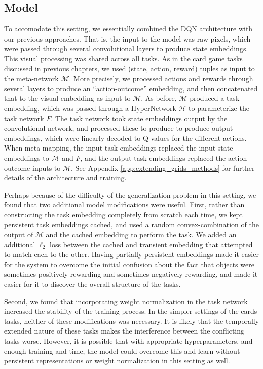 \subsection{Model}
To accomodate this setting, we essentially combined the DQN architecture \citep{Mnih2015} with our previous approaches. That is, the input to the model was raw pixels, which were passed through several convolutional layers to produce state embeddings. This visual processing was shared across all tasks. As in the card game tasks discussed in previous chapters, we used (state, action, reward) tuples as input to the meta-network \(\mathcal{M}\). More precisely, we processed actions and rewards through several layers to produce an ``action-outcome'' embedding, and then concatenated that to the visual embedding as input to \(\mathcal{M}\). As before, \(\mathcal{M}\) produced a task embedding, which was passed through a HyperNetwork \(\mathcal{H}\) to parameterize the task network \(F\). The task network took state embeddings output by the convolutional network, and processed these to produce to produce output embeddings, which were linearly decoded to Q-values for the different actions. When meta-mapping, the input task embeddings replaced the input state embeddings to \(\mathcal{M}\) and \(F\), and the output task embeddings replaced the action-outcome inputs to \(\mathcal{M}\). See Appendix \ref{app:extending_grids_methods} for further details of the architecture and training. \par 
Perhaps because of the difficulty of the generalization problem in this setting, we found that two additional model modifications were useful. First, rather than constructing the task embedding completely from scratch each time, we kept persistent task embeddings cached, and used a random convex-combination of the output of \(\mathcal{M}\) and the cached embedding to perform the task. We added an additional \(\ell_2\) loss between the cached and transient embedding that attempted to match each to the other. Having partially persistent embeddings made it easier for the system to overcome the initial confusion about the fact that objects were sometimes positively rewarding and sometimes negatively rewarding, and made it easier for it to discover the overall structure of the tasks. \par
Second, we found that incorporating weight normalization \citep{Salimans2016} in the task network increased the stability of the training process. In the simpler settings of the cards tasks, neither of these modifications was necessary. It is likely that the temporally extended nature of these tasks makes the interference between the conflicting tasks worse. However, it is possible that with appropriate hyperparameters, and enough training and time, the model could overcome this and learn without persistent representations or weight normalization in this setting as well. \par 

